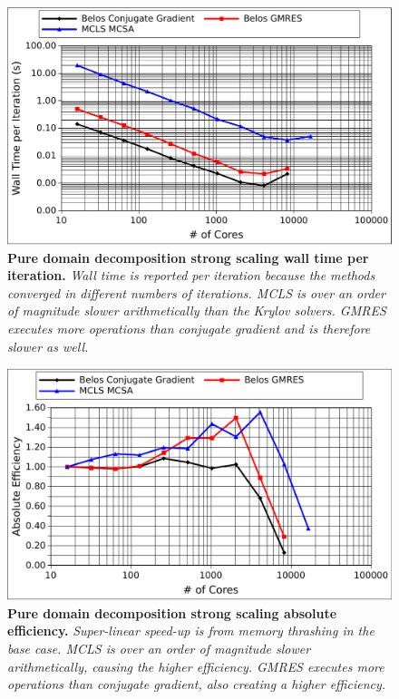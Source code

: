 \begin{figure}[t!]
  \begin{center}
    \includegraphics[width=6in]{chapters/parallel_mc/titan_pure_strong_time.pdf}
  \end{center}
  \caption{\textbf{Pure domain decomposition strong scaling wall time
      per iteration.} \textit{Wall time is reported per iteration
      because the methods converged in different numbers of
      iterations. MCLS is over an order of magnitude slower
      arithmetically than the Krylov solvers. GMRES executes more
      operations than conjugate gradient and is therefore slower as
      well.}}
  \label{fig:titan_pure_strong_time}
\end{figure}

\begin{figure}[t!]
  \begin{center}
    \includegraphics[width=6in]{chapters/parallel_mc/titan_pure_strong.pdf}
  \end{center}
  \caption{\textbf{Pure domain decomposition strong scaling absolute
      efficiency.}  \textit{Super-linear speed-up is from memory
      thrashing in the base case. MCLS is over an order of magnitude
      slower arithmetically, causing the higher efficiency. GMRES
      executes more operations than conjugate gradient, also creating
      a higher efficiency.}}
  \label{fig:titan_pure_strong}
\end{figure}

